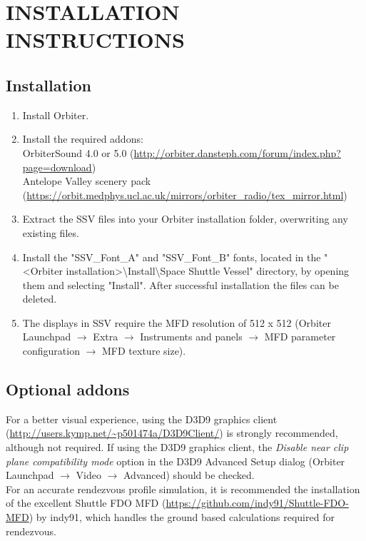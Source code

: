 \documentclass[Space_Shuttle_Vessel_Manual.tex]{subfiles}
\begin{document}
\section{INSTALLATION INSTRUCTIONS}
\begin{multicols*}{2}

\subsection{Installation}
\noindent
\begin{enumerate}
\item Install Orbiter.

\item Install the required addons:\\
OrbiterSound 4.0 or 5.0 (\url{http://orbiter.dansteph.com/forum/index.php?page=download})\\
Antelope Valley scenery pack (\url{https://orbit.medphys.ucl.ac.uk/mirrors/orbiter_radio/tex_mirror.html})

\item Extract the SSV files into your Orbiter installation folder, overwriting any existing files.\\

\item Install the "SSV\_Font\_A" and "SSV\_Font\_B" fonts, located in the "<Orbiter installation>\textbackslash Install\textbackslash Space Shuttle Vessel" directory, by opening them and selecting "Install". After successful installation the files can be deleted.

\item The displays in SSV require the MFD resolution of 512 x 512 (Orbiter Launchpad $\rightarrow$ Extra $\rightarrow$ Instruments and panels $\rightarrow$ MFD parameter configuration $\rightarrow$ MFD texture size).
\end{enumerate}


\subsection{Optional addons}
For a better visual experience, using the D3D9 graphics client (\url{http://users.kymp.net/~p501474a/D3D9Client/}) is strongly recommended, although not required. If using the D3D9 graphics client, the \textit{Disable near clip plane compatibility mode} option in the D3D9 Advanced Setup dialog (Orbiter Launchpad $\rightarrow$ Video $\rightarrow$ Advanced) should be checked.\\
For an accurate rendezvous profile simulation, it is recommended the installation of the excellent Shuttle FDO MFD (\url{https://github.com/indy91/Shuttle-FDO-MFD}) by indy91, which handles the ground based calculations required for rendezvous.\\
\end{multicols*}
\end{document}
